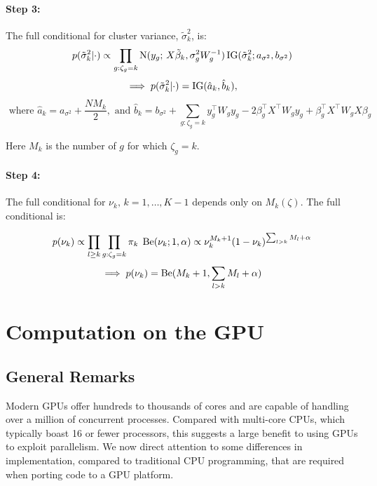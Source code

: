 {\paragraph{Step 3:} The full conditional for cluster variance, $\tilde{\sigma}_k^2$, is:
    \begin{equation}
      p(\tilde{\sigma}_k^2|\cdot) \propto \prod_{g:\zeta_g=k}
      \operatorname{N}(y_g;\,X\tilde{\beta}_k, \sigma^2_gW^{-1}_g)
      \operatorname{IG}(\tilde{\sigma}_k^2; a_{\sigma^2},b_{\sigma^2})
    \end{equation}
    \begin{equation*}
      \implies p(\tilde{\sigma}_k^2|\cdot) = \operatorname{IG}(\hat{a}_k,\hat{b}_k), 
    \end{equation*}
    \begin{equation*}
      \mbox{ where }\hat{a}_k = a_{\sigma^2} + \frac{NM_k}{2},\mbox{ and }\hat{b}_k= b_{\sigma^2} + \sum_{g:\zeta_g=k}y_g^\top W_g y_g -2 \beta_g^\top X^\top W_g y_g  +\beta_g^\top X^\top W_g X \beta_g
    \end{equation*}

    Here $M_k$ is the number of $g$ for which $\zeta_g = k$. 
\paragraph{Step 4:} The full conditional for $\nu_k,\,k=1,\ldots,K-1$ depends only on $M_k(\zeta)$. The full conditional is:

  \begin{equation}
    p(\nu_k) \propto \prod_{l \ge k} \prod_{g:\zeta_g=k} \pi_k \; \operatorname{Be}(\nu_k; 1, \alpha) \propto \nu_k^{M_k + 1}(1-\nu_k)^{\sum_{l > k} M_l + \alpha} 
  \end{equation}
  \begin{equation*}
    \implies p(\nu_k)=\operatorname{Be}(M_k + 1, \sum_{l>k}M_l + \alpha)
  \end{equation*}

\section{Computation on the GPU}
\label{sec:parallel}
\subsection{General Remarks}
Modern GPUs offer hundreds to thousands of cores and are capable of handling over a million of concurrent processes. Compared with multi-core CPUs, which typically boast 16 or fewer processors, this suggests a large benefit to using GPUs to exploit parallelism. 
We now direct attention to some differences in implementation, compared to traditional CPU programming, that are required when porting code to a GPU platform.

}
